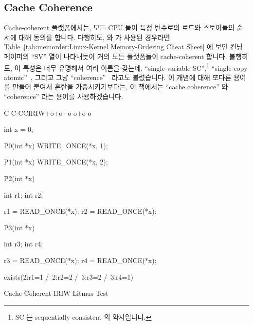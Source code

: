 \subsection{Cache Coherence}
\label{sec:memorder:Cache Coherence}

Cache-coherent 플랫폼에서는, 모든 CPU 들이 특정 변수로의 로드와 스토어들의
순서에 대해 동의를 합니다.
다행히도,  와  가 사용된 경우라면
Table~\ref{tab:memorder:Linux-Kernel Memory-Ordering Cheat Sheet}
에 보인 컨닝 페이퍼의 ``SV'' 열이 나타내듯이 거의 모든 플랫폼들이
cache-coherent 합니다.
불행히도, 이 특성은 너무 유명해서 여러 이름을 갖는데, ``single-variable
SC'',\footnote{
	SC 는 sequentially consistent 의 약자입니다.}
``single-copy atomic''~\cite{Stone:1995:SP:623262.623912}, 그리고 그냥
``coherence''~\cite{JadeAlglave2011ppcmem} 라고도 불렸습니다.
이 개념에 대해 또다른 용어를 만들어 붙여서 혼란을 가중시키기보다는, 이 책에서는
``cache coherence'' 와 ``coherence'' 라는 용어를 사용하겠습니다.

\begin{listing}[tbp]
{ \scriptsize
\begin{verbbox}[\LstLineNo]
C C-CCIRIW+o+o+o-o+o-o

{
int x = 0;
}

P0(int *x)
{
  WRITE_ONCE(*x, 1);
}

P1(int *x)
{
  WRITE_ONCE(*x, 2);
}

P2(int *x)
{
  int r1;
  int r2;

  r1 = READ_ONCE(*x);
  r2 = READ_ONCE(*x);
}

P3(int *x)
{
  int r3;
  int r4;

  r3 = READ_ONCE(*x);
  r4 = READ_ONCE(*x);
}

exists(2:r1=1 /\ 2:r2=2 /\ 3:r3=2 /\ 3:r4=1)
\end{verbbox}
}
\centering
\theverbbox
\caption{Cache-Coherent IRIW Litmus Test}
\label{lst:memorder:Cache-Coherent IRIW Litmus Test}
\end{listing}

